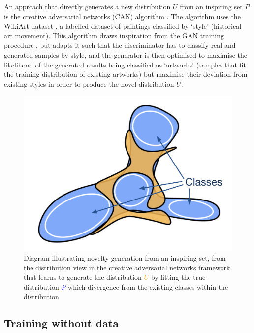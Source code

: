 An approach that directly generates a new distribution $U$ from an inspiring set $P$ is the creative adversarial networks (CAN) algorithm \citep{elgammal2017can}. 
The algorithm uses the WikiArt dataset \citep{saleh2016large}, a labelled dataset of paintings classified by `style' (historical art movement). This algorithm draws inspiration from the GAN training procedure \citep{goodfellow2014generative}, but adapts it such that the discriminator has to classify real and generated samples by style, and the generator is then optimised to maximise the likelihood of the generated results being classified as `artworks' (samples that fit the training distribution of existing artworks) but maximise their deviation from existing styles in order to produce the novel distribution $U$.

\begin{figure}[!htbp]
    \centering
    \includegraphics[width=1\textwidth]{figures/c6_active_div/diagrams/creative_adversarial_networks.png}
    \caption[Novelty generation from an inspiring set]{Diagram illustrating novelty generation from an inspiring set, from the distribution view in the creative adversarial networks framework \citep{elgammal2017can} that learns to generate the distribution \textcolor{orange}{$U$} by fitting the true distribution \textcolor{blue}{$P$} which divergence from the existing classes within the distribution}
  \label{fig:c6:novelty-gen-inspiring-set}
  \end{figure}

\subsection{Training without data}
\label{survey:nodata}


